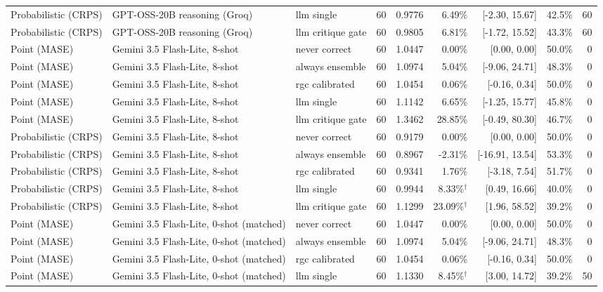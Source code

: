 \begin{tabular}{lllrrrrrr}
Probabilistic (CRPS) & GPT-OSS-20B reasoning (Groq) & llm single & 60 & 0.9776 & 6.49\% & [-2.30, 15.67] & 42.5\% & 60 \\
Probabilistic (CRPS) & GPT-OSS-20B reasoning (Groq) & llm critique gate & 60 & 0.9805 & 6.81\% & [-1.72, 15.52] & 43.3\% & 60 \\
Point (MASE) & Gemini 3.5 Flash-Lite, 8-shot & never correct & 60 & 1.0447 & 0.00\% & [0.00, 0.00] & 50.0\% & 0 \\
Point (MASE) & Gemini 3.5 Flash-Lite, 8-shot & always ensemble & 60 & 1.0974 & 5.04\% & [-9.06, 24.71] & 48.3\% & 0 \\
Point (MASE) & Gemini 3.5 Flash-Lite, 8-shot & rgc calibrated & 60 & 1.0454 & 0.06\% & [-0.16, 0.34] & 50.0\% & 0 \\
Point (MASE) & Gemini 3.5 Flash-Lite, 8-shot & llm single & 60 & 1.1142 & 6.65\% & [-1.25, 15.77] & 45.8\% & 0 \\
Point (MASE) & Gemini 3.5 Flash-Lite, 8-shot & llm critique gate & 60 & 1.3462 & 28.85\% & [-0.49, 80.30] & 46.7\% & 0 \\
Probabilistic (CRPS) & Gemini 3.5 Flash-Lite, 8-shot & never correct & 60 & 0.9179 & 0.00\% & [0.00, 0.00] & 50.0\% & 0 \\
Probabilistic (CRPS) & Gemini 3.5 Flash-Lite, 8-shot & always ensemble & 60 & 0.8967 & -2.31\% & [-16.91, 13.54] & 53.3\% & 0 \\
Probabilistic (CRPS) & Gemini 3.5 Flash-Lite, 8-shot & rgc calibrated & 60 & 0.9341 & 1.76\% & [-3.18, 7.54] & 51.7\% & 0 \\
Probabilistic (CRPS) & Gemini 3.5 Flash-Lite, 8-shot & llm single & 60 & 0.9944 & 8.33\%$^\dagger$ & [0.49, 16.66] & 40.0\% & 0 \\
Probabilistic (CRPS) & Gemini 3.5 Flash-Lite, 8-shot & llm critique gate & 60 & 1.1299 & 23.09\%$^\dagger$ & [1.96, 58.52] & 39.2\% & 0 \\
Point (MASE) & Gemini 3.5 Flash-Lite, 0-shot (matched) & never correct & 60 & 1.0447 & 0.00\% & [0.00, 0.00] & 50.0\% & 0 \\
Point (MASE) & Gemini 3.5 Flash-Lite, 0-shot (matched) & always ensemble & 60 & 1.0974 & 5.04\% & [-9.06, 24.71] & 48.3\% & 0 \\
Point (MASE) & Gemini 3.5 Flash-Lite, 0-shot (matched) & rgc calibrated & 60 & 1.0454 & 0.06\% & [-0.16, 0.34] & 50.0\% & 0 \\
Point (MASE) & Gemini 3.5 Flash-Lite, 0-shot (matched) & llm single & 60 & 1.1330 & 8.45\%$^\dagger$ & [3.00, 14.72] & 39.2\% & 50 \\

\end{tabular}
